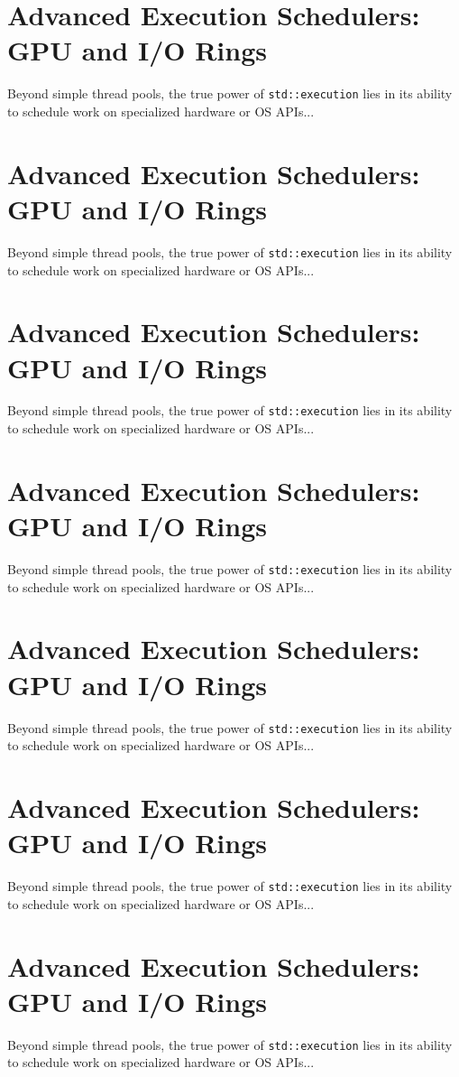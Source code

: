 \section{Advanced Execution Schedulers: GPU and I/O Rings}
Beyond simple thread pools, the true power of \texttt{std::execution} lies in its ability to schedule work on specialized hardware or OS APIs...

\section{Advanced Execution Schedulers: GPU and I/O Rings}
Beyond simple thread pools, the true power of \texttt{std::execution} lies in its ability to schedule work on specialized hardware or OS APIs...

\section{Advanced Execution Schedulers: GPU and I/O Rings}
Beyond simple thread pools, the true power of \texttt{std::execution} lies in its ability to schedule work on specialized hardware or OS APIs...

\section{Advanced Execution Schedulers: GPU and I/O Rings}
Beyond simple thread pools, the true power of \texttt{std::execution} lies in its ability to schedule work on specialized hardware or OS APIs...

\section{Advanced Execution Schedulers: GPU and I/O Rings}
Beyond simple thread pools, the true power of \texttt{std::execution} lies in its ability to schedule work on specialized hardware or OS APIs...

\section{Advanced Execution Schedulers: GPU and I/O Rings}
Beyond simple thread pools, the true power of \texttt{std::execution} lies in its ability to schedule work on specialized hardware or OS APIs...

\section{Advanced Execution Schedulers: GPU and I/O Rings}
Beyond simple thread pools, the true power of \texttt{std::execution} lies in its ability to schedule work on specialized hardware or OS APIs...

